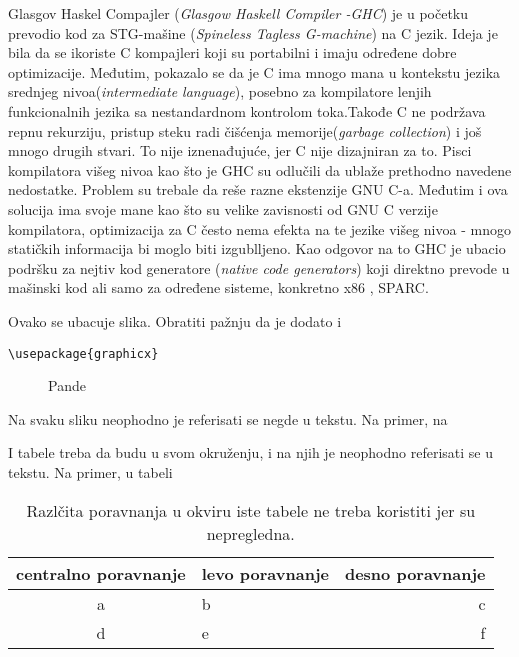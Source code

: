 Glasgov Haskel Compajler (\emph {Glasgow Haskell Compiler -GHC}) je u početku prevodio kod za STG-mašine (\emph{Spineless Tagless G-machine}) na C jezik. Ideja je bila da se ikoriste C kompajleri koji su portabilni i imaju određene dobre optimizacije. Međutim, pokazalo se da je C ima mnogo mana u kontekstu jezika srednjeg nivoa(\emph {intermediate language}), posebno za kompilatore lenjih funkcionalnih jezika sa nestandardnom kontrolom toka.Takođe C ne podržava repnu rekurziju, pristup steku radi čišćenja memorije(\emph{garbage collection}) i još mnogo drugih stvari. To nije iznenađujuće, jer C nije dizajniran za to. Pisci kompilatora višeg nivoa kao što je GHC su odlučili da ublaže prethodno navedene nedostatke. Problem su trebale da reše razne ekstenzije GNU C-a. Međutim i ova solucija ima svoje mane kao što su velike zavisnosti od GNU C verzije kompilatora, optimizacija za C često nema efekta na te jezike višeg nivoa - mnogo statičkih informacija bi moglo biti izgublljeno. Kao odgovor na to GHC je ubacio podršku za nejtiv kod generatore (\emph{native code generators}) koji direktno prevode u mašinski kod ali samo za određene sisteme, konkretno x86 , SPARC.



\begin{primer} Ovako se ubacuje slika. Obratiti pažnju da je dodato i 
\begin{verbatim}
\usepackage{graphicx}
\end{verbatim}

\begin{figure}[h!]
\begin{center}
\end{center}
\caption{Pande}
\label{fig:pande}
\end{figure}

Na svaku sliku neophodno je referisati se negde u tekstu. Na primer, na %
\end{primer}

\begin{primer} I tabele treba da budu u svom okruženju, i na njih je neophodno referisati se u tekstu. Na primer, u tabeli%

\begin{table}[h!]
\begin{center}
\caption{Razlčita poravnanja u okviru iste tabele ne treba koristiti jer su nepregledna.}
\begin{tabular}{|c|l|r|} \hline
centralno poravnanje& levo poravnanje& desno poravnanje\\ \hline
a &b&c\\ \hline
d &e&f\\ \hline
\end{tabular}
\label{tab:tabela1}
\end{center}
\end{table}

\end{primer}